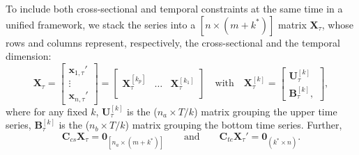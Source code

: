 \documentclass[a4paper,11pt]{article}
\newcommand{\xvet}{\bm{x}}
\newcommand{\Bvet}{\bm{B}}
\newcommand{\Cvet}{\bm{C}}
\newcommand{\Uvet}{\bm{U}}
\newcommand{\Xvet}{\bm{X}}
\newcommand{\Zerovet}{\bm{0}}
\theoremstyle{definition}
\begin{document}
To include both cross-sectional and temporal constraints at the same time in a unified framework, we stack the series into a $[n \times (m+k^\ast)]$ matrix $\Xvet_\tau$, whose rows and columns represent, respectively, the cross-sectional and the temporal dimension:
\begin{equation}
	\label{eq:Xtau}
	\Xvet_\tau = \begin{bmatrix}
		\xvet_{1,\tau}' \\
		\vdots          \\
		\xvet_{n,\tau}'
	\end{bmatrix} = \begin{bmatrix}
		\Xvet_{\tau}^{[k_p]} & \dots & \Xvet_{\tau}^{[k_1]} \\ \end{bmatrix}
	\quad \text{with} \quad \Xvet_{\tau}^{[k]} = \begin{bmatrix}
		\Uvet_{\tau}^{[k]} \\
		\Bvet_{\tau}^{[k]},
	\end{bmatrix},
\end{equation}
where for any fixed $k$,
$\Uvet_{\tau}^{[k]}$ is the ($n_a\times T/k$) matrix grouping the upper time series, $\Bvet_{\tau}^{[k]}$ is the ($n_b\times T/k$) matrix grouping the bottom time series. Further,
$$
	\Cvet_{cs}\Xvet_\tau = \Zerovet_{\left[n_a \times (m+k^\ast)\right]} \qquad \text{and} \qquad \Cvet_{te}\Xvet_\tau' = \Zerovet_{(k^\ast \times n)} .
$$


\end{document}
